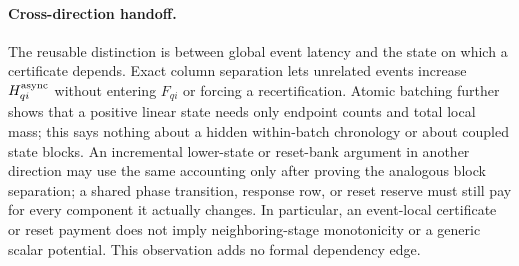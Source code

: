 \paragraph{Cross-direction handoff.}
The reusable distinction is between global event latency and the state on
which a certificate depends.  Exact column separation lets unrelated events
increase $H_{qi}^{\rm async}$ without entering $F_{qi}$ or forcing a
recertification.  Atomic batching further shows that a positive linear state
needs only endpoint counts and total local mass; this says nothing about a
hidden within-batch chronology or about coupled state blocks.  An incremental
lower-state or reset-bank argument in another
direction may use the same accounting only after proving the analogous block
separation; a shared phase transition, response row, or reset reserve must
still pay for every component it actually changes.  In particular, an
event-local certificate or reset payment does not imply neighboring-stage
monotonicity or a generic scalar potential.  This observation adds no formal
dependency edge.

